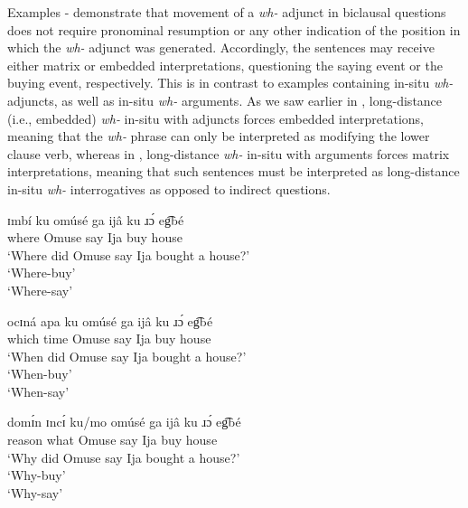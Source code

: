 \documentclass[output=paper,colorlinks,citecolor=brown
]{langscibook}
\begin{document}
\noindent Examples - demonstrate that movement of a \textit{wh-} adjunct in biclausal questions does not require pronominal resumption or any other indication of the position in which the \textit{wh-} adjunct was generated. Accordingly, the sentences may receive either matrix or embedded interpretations, questioning the saying event or the buying event, respectively. This is in contrast to examples containing in-situ \textit{wh-} adjuncts, as well as in-situ \textit{wh-} arguments. As we saw earlier in , long-distance (i.e., embedded) \textit{wh-} in-situ with adjuncts forces embedded interpretations, meaning that the \textit{wh-} phrase can only be interpreted as modifying the lower clause verb, whereas in , long-distance \textit{wh-} in-situ with arguments forces matrix interpretations, meaning that such sentences must be interpreted as long-distance in-situ \textit{wh-} interrogatives as opposed to indirect questions.

\ea \label{ex:matte:split1718}

\begin{xlist}

    \ex \label{ex:matte:16c}
    \gll ɪmbí ku omúsé ga ijâ ku ɹɔ́	eg͡bé\\
    where \Foc{} Omuse say Ija \Pfv{} buy house\\
    \glt `Where did Omuse say Ija bought a house?'\\
    \langscicheckmark `Where-buy'\\
    \langscicheckmark `Where-say'

    \ex \label{ex:matte:16d}
    \gll ocɪná apa ku omúsé ga ijâ ku ɹɔ́ eg͡bé\\
    which time \Foc{} Omuse say Ija \Pfv{} buy house\\
    \glt `When did Omuse say Ija bought a house?'\\
    \langscicheckmark `When-buy'\\
    \langscicheckmark `When-say'
    
    \ex \label{ex:matte:16e}
    \gll domɪ́n ɪncɪ́ ku/mo omúsé ga ijâ ku ɹɔ́ eg͡bé\\
    reason what \Foc{} Omuse say Ija \Pfv{} buy house\\
    \glt `Why did Omuse say Ija bought a house?'\\
    \langscicheckmark `Why-buy'\\
    \langscicheckmark `Why-say'
    
\end{xlist}
\z
\end{document}
